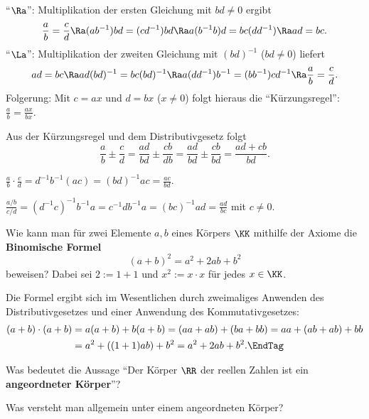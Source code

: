 \begin{antwort}
   "`$\Ra$"': Multiplikation der ersten 
  Gleichung mit $bd \not=0$ ergibt 
  \[
  \frac{a}{b} = \frac{c}{d} \Ra 
  (ab^{-1})bd=(cd^{-1})bd \Ra 
  a(b^{-1}b)d=bc(dd^{-1}) \Ra ad = bc.
  \]
  "`$\La$"': Multiplikation der zweiten Gleichung mit $(bd)^{-1}$ ($bd\not=0$) 
  liefert
  \[
  ad=bc \Ra 
  ad(bd)^{-1} = bc (bd)^{-1} \Ra
  a(dd^{-1})b^{-1} = (bb^{-1}) c d^{-1} \Ra 
  \frac{a}{b} = \frac{c}{d}. 
  \]
  Folgerung: Mit $c=ax$ und $d=bx$ ($x\not=0$) folgt hieraus 
  die "`Kürzungsregel"': 
  $\frac{a}{b}=\frac{ax}{bx}$.

  \medskip\noindent
  \quad Aus der Kürzungsregel und dem Distributivgesetz folgt
  \[
  \frac{a}{b}\pm \frac{c}{d} = 
  \frac{ad}{bd} \pm \frac{cb}{db} = 
  \frac{ad}{bd} \pm \frac{cb}{bd} = 
  \frac{ad+cb}{bd}.
  \]

  \medskip\noindent
  \quad
  $\displaystyle 
  \frac{a}{b}\cdot\frac{c}{d} = 
  d^{-1}b^{-1}( ac ) =  
  (bd)^{-1} ac = \frac{ac}{bd}$.

  \medskip\noindent
  \quad
  $\displaystyle 
  \frac{a/b}{c/d} = (d^{-1}c)^{-1} b^{-1} a = 
  c^{-1} db^{-1} a = (bc)^{-1} ad = \frac{ad}{bc}$ \quad mit $c\not=0$.
  \AntEnd
\end{antwort}


\begin{frage} 
  Wie kann man für zwei Elemente $a,b$ eines Körpers $\KK$
  mithilfe der Axiome die 
  \textbf{Binomische Formel}
  \[
  (a+b)^2 =a^2+2ab +b^2 
  \]
  beweisen? Dabei sei $2:=1+1$ und $x^2 := x\cdot x$ f\"ur jedes 
  $x\in\KK$.  
\end{frage} 

\begin{antwort}
  Die Formel ergibt sich im Wesentlichen 
  durch zweimaliges Anwenden des Distributivgesetzes 
  und einer Anwendung des Kommutativgesetzes:
  \nobelowskip
  \begin{align}
    (a+b)\cdot (a+b) &= a(a+b)+b(a+b)= (aa +ab) +(ba+bb) = 
    aa +( ab+ab ) +bb \notag \\
    &= a^2 + ( (1+1)ab )+b^2 = a^2+2ab +b^2. \EndTag
  \end{align}
\end{antwort}






\begin{frage}
  \label{01_anax} 
  Was bedeutet die Aussage "`Der Körper $\RR$ der reellen Zahlen ist ein 
  \textbf{angeordneter Körper}"'?
  
  \medskip
  Was versteht man allgemein unter einem angeordneten Körper?
\end{frage}

